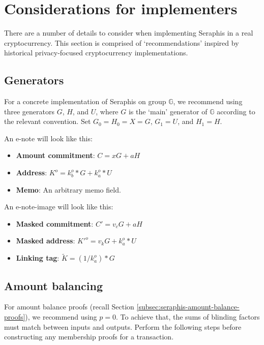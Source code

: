 \section{Considerations for implementers}
\label{sec:considerations-implementers}

There are a number of details to consider when implementing Seraphis in a real cryptocurrency. This section is comprised of `recommendations' inspired by historical privacy-focused cryptocurrency implementations.


\subsection{Generators}
\label{subsec:implementers-generators}

For a concrete implementation of Seraphis on group $\mathbb{G}$, we recommend using three generators $G$, $H$, and $U$, where $G$ is the `main' generator of $\mathbb{G}$ according to the relevant convention. Set $G_0 = H_0 = X = G$, $G_1 = U$, and $H_1 = H$.

An e-note will look like this:

\begin{itemize}
    \item \textbf{Amount commitment}: $C = x G + a H$
    \item \textbf{Address}: $K^o = k^o_b*G + k^o_a*U$
    \item \textbf{Memo}: An arbitrary memo field.
\end{itemize}

An e-note-image will look like this:

\begin{itemize}
    \item \textbf{Masked commitment}: $C' = v_c G + a H$
    \item \textbf{Masked address}: $K'^o = v_k G + k^o_a*U$
    \item \textbf{Linking tag}: $\tilde{K} = (1/k^o_a)*G$
\end{itemize}


\subsection{Amount balancing}
\label{subsec:implementers-amount-balancing}

For amount balance proofs (recall Section \ref{subsec:seraphis-amount-balance-proofs}), we recommend using $p = 0$. To achieve that, the sums of blinding factors must match between inputs and outputs. Perform the following steps before constructing any membership proofs for a transaction.

